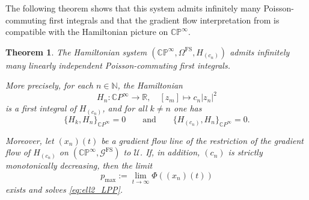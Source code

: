 \documentclass[12pt]{amsart}
\newtheorem{theorem}{Theorem}[section]
\numberwithin{figure}{section}
\numberwithin{table}{section}
\numberwithin{equation}{section}
\begin{document}
The following theorem shows that this system admits infinitely many Poisson-commuting first integrals and that the gradient flow interpretation from  is compatible with the Hamiltonian picture on \(\mathbb{CP}^\infty\).

\begin{theorem}\label{t: integrability of Hamiltonian system}
The Hamiltonian system \( (\mathbb{CP}^\infty, \Omega^{\mathrm{FS}}, H_{(c_n)}) \) admits infinitely many linearly independent Poisson-commuting first integrals.

More precisely, for each \(n\in \mathbb{N}\), the Hamiltonian
\begin{equation}\label{eq: Hamiltonians on CP inf for integrability}
	H_n : \mathbb{C}P^\infty \longrightarrow \mathbb{R}, \quad [z_m] \mapsto c_n|z_n|^2
\end{equation}
is a first integral of \(H_{(c_n)}\), and for all \(k\neq n\) one has
\[
\{H_k,H_n\}_{\mathbb{C}P^\infty}=0
\qquad \text{and} \qquad
\{H_{(c_n)},H_n\}_{\mathbb{C}P^\infty}=0.
\]

Moreover, let \( (x_n)(t) \) be a gradient flow line of the restriction of the gradient flow of \( H_{(c_n)} \) on \( (\mathbb{CP}^\infty, \mathcal{G}^{\mathrm{FS}}) \) to \( \mathcal{U} \). If, in addition, \((c_n)\) is strictly monotonically decreasing, then the limit
\[
p_{\max} := \lim_{t \to \infty} \varPhi\left((x_n)(t)\right)
\]
exists and solves \eqref{eq:ell2_LPP}.
\end{theorem}
\end{document}
